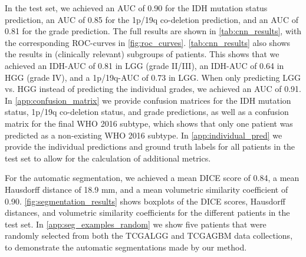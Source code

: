 In the test set, we achieved an \gls{AUC} of 0.90 for the \gls{IDH} mutation status prediction, an \gls{AUC} of 0.85 for the 1p/19q co-deletion prediction, and an \gls{AUC} of 0.81 for the grade prediction.
The full results are shown in \cref{tab:cnn_results}, with the corresponding \gls{ROC}-curves in \cref{fig:roc_curves}.
\cref{tab:cnn_results} also shows the results in (clinically relevant) subgroups of patients.
This shows that we achieved an \gls{IDH}-\gls{AUC} of 0.81 in \gls{LGG} (grade II/III), an \gls{IDH}-\gls{AUC} of 0.64 in \gls{HGG} (grade IV), and a 1p/19q-\gls{AUC} of 0.73 in \gls{LGG}.
When only predicting \gls{LGG} vs. \gls{HGG} instead of predicting the individual grades, we achieved an \gls{AUC} of 0.91.
In \cref{app:confusion_matrix} we provide confusion matrices for the \gls{IDH} mutation status, 1p/19q co-deletion status, and grade predictions, as well as a confusion matrix for the final \gls{WHO} 2016 subtype, which shows that only one patient was predicted as a non-existing \gls{WHO} 2016 subtype.
In  \cref{app:individual_pred} we provide the individual predictions and ground truth labels for all patients in the test set to allow for the calculation of additional metrics.

For the automatic segmentation, we achieved a mean DICE score of 0.84, a mean Hausdorff distance of 18.9 mm, and a mean volumetric similarity coefficient of 0.90.
\cref{fig:segmentation_results} shows boxplots of the DICE scores, Hausdorff distances, and volumetric similarity coefficients for the different patients in the test set.
In \cref{app:seg_examples_random} we show five patients that were randomly selected from both the \gls{TCGALGG} and \gls{TCGAGBM} data collections, to demonstrate the automatic segmentations made by our method.


